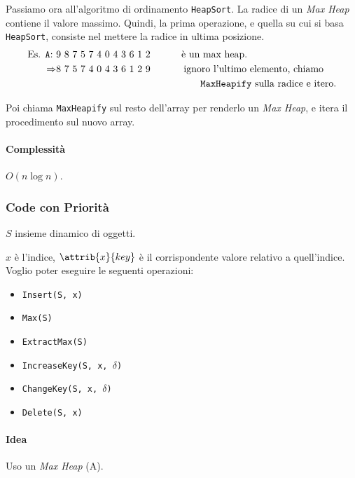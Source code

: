 
Passiamo ora all'algoritmo di ordinamento \texttt{HeapSort}. La radice di un 
\emph{Max Heap} contiene il valore massimo. Quindi, la prima operazione, e quella su cui si basa \texttt{HeapSort}, 
consiste nel mettere la radice in ultima posizione.
\begin{align*}
\text{Es. \texttt{A}: }& \text{9 8 7 5 7 4 0 4 3 6 1 2 \hspace{1cm}} \text{è un max heap.} \\
\Rightarrow & \text{8 7 5 7 4 0 4 3 6 1 2 9} \hspace{1.2cm} \text{ignoro l'ultimo elemento, chiamo} \\
& \hspace{5.2cm}\text{\texttt{MaxHeapify} sulla radice e itero.}
\end{align*}

Poi chiama \texttt{MaxHeapify} sul resto dell'array per renderlo un \emph{Max Heap}, e itera il procedimento 
sul nuovo array.



\paragraph{Complessità} $O(n \log n)$.

\subsubsection{Code con Priorità} \label{codeconpriorita}
$S$ insieme dinamico di oggetti. \par
$x$ è l'indice, $\attrib{x}{key}$ è il corrispondente valore relativo a quell'indice.
Voglio poter eseguire le seguenti operazioni:
\begin{itemize}[noitemsep]
	\item \texttt{Insert(S, x)}
	\item \texttt{Max(S)}
	\item \texttt{ExtractMax(S)}
	\item \texttt{IncreaseKey(S, x, $\delta$)}
	\item \texttt{ChangeKey(S, x, $\delta$)}
	\item \texttt{Delete(S, x)}
\end{itemize}
\paragraph{Idea} Uso un \emph{Max Heap} (A).

